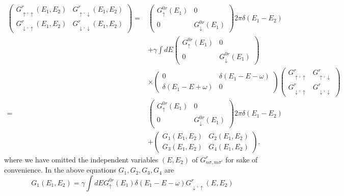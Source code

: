 \documentclass[11pt,a4paper]{article}
\begin{document}
\begin{equation}
\begin{split}
\left(\begin{array}{cc}
G_{\uparrow,\uparrow}^{r}(E_{1},E_{2}) & G_{\uparrow,\downarrow}^{r}(E_{1},E_{2}) \\
G_{\downarrow,\uparrow}^{r}(E_{1},E_{2}) & G_{\downarrow,\downarrow}^{r}(E_{1},E_{2})
\end{array}\right) = &
\left(\begin{array}{cc}
G_{\uparrow}^{0r}(E_{1}) &0 \\
0 & G_{\downarrow}^{0r}(E_{1})
\end{array}\right) 2\pi\delta(E_{1}-E_{2})\\
&+ \gamma\int dE\left(\begin{array}{cc}
G_{\uparrow}^{0r}(E_{1}) &0 \\
0 & G_{\downarrow}^{0r}(E_{1})
\end{array}\right) \\
&\times
\left(\begin{array}{cc}
0 & \delta(E_{1}-E-\omega) \\
\delta(E_{1}-E+\omega) & 0
\end{array}\right)
 \left(\begin{array}{cc}
G_{\uparrow,\uparrow}^{r} & G_{\uparrow,\downarrow}^{r} \\
G_{\downarrow,\uparrow}^{r} & G_{\downarrow,\downarrow}^{r}
\end{array}\right) \\
=&\left(\begin{array}{cc}
G_{\uparrow}^{0r}(E_{1}) &0 \\
0 & G_{\downarrow}^{0r}(E_{1})
\end{array}\right) 2\pi\delta(E_{1}-E_{2})\\
&+ \left(\begin{array}{cc}
G_{1}(E_{1},E_{2}) & G_{2}(E_{1},E_{2}) \\
G_{3}(E_{1},E_{2}) & G_{4}(E_{1},E_{2})
\end{array}\right).
\end{split}
\end{equation}
where we have omitted the independent variables $(E, E_{2})$ of $G_{n \sigma, m\sigma'}^{r}$ for sake of convenience. In the above equations $G_{1}, G_{2}, G_{3}, G_{4}$ are
\begin{equation}
G_{1}(E_{1},E_{2}) = \gamma \int dE G_{ \uparrow}^{0r}\left(E_{1}\right) \delta(E_{1}-E-\omega) G_{ \downarrow, \uparrow}^{r}(E,E_{2})
\end{equation}
\end{document}
